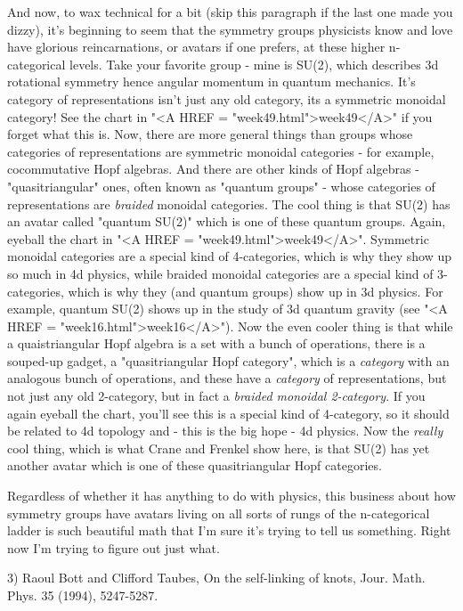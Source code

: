 And now, to wax technical for a bit (skip this paragraph if the last
one made you dizzy), it's beginning to seem that the symmetry groups
physicists know and love have glorious reincarnations, or avatars if
one prefers, at these higher n-categorical levels.  Take your favorite
group - mine is SU(2), which describes 3d rotational symmetry hence
angular momentum in quantum mechanics.  It's category of
representations isn't just any old category, its a symmetric monoidal
category!  See the chart in "<A HREF = "week49.html">week49</A>" if
you forget what this is.  Now, there are more general things than
groups whose categories of representations are symmetric monoidal
categories - for example, cocommutative Hopf algebras.  And there are
other kinds of Hopf algebras - "quasitriangular" ones, often known
as "quantum groups" - whose categories of representations are
\emph{braided} monoidal categories.  The cool thing is that SU(2) has an
avatar called "quantum SU(2)" which is one of these quantum groups.
Again, eyeball the chart in "<A HREF = "week49.html">week49</A>".
Symmetric monoidal categories are a special kind of 4-categories,
which is why they show up so much in 4d physics, while braided
monoidal categories are a special kind of 3-categories, which is why
they (and quantum groups) show up in 3d physics.  For example, quantum
SU(2) shows up in the study of 3d quantum gravity (see "<A HREF =
"week16.html">week16</A>").  Now the even cooler thing is that while a
quaistriangular Hopf algebra is a set with a bunch of operations,
there is a souped-up gadget, a "quasitriangular Hopf category", which
is a \emph{category} with an analogous bunch of operations, and these have a
\emph{category} of representations, but not just any old 2-category, but in
fact a \emph{braided monoidal 2-category}.  If you again eyeball the chart,
you'll see this is a special kind of 4-category, so it should be
related to 4d topology and - this is the big hope - 4d physics.
Now the \emph{really} cool thing, which is what Crane and Frenkel show
here, is that SU(2) has yet another avatar which is one of these
quasitriangular Hopf categories.

Regardless of whether it has anything to do with physics, this business
about how symmetry groups have avatars living on all sorts of rungs
of the n-categorical ladder is such beautiful math that I'm sure
it's trying to tell us something.  Right now I'm trying to figure
out just what.

3) Raoul Bott and Clifford Taubes, On the self-linking of knots, 
Jour. Math. Phys. 35 (1994), 5247-5287.

